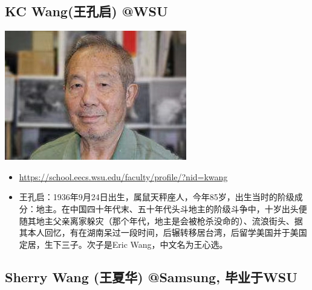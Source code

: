 \documentclass[9pt, b5paper]{article}
\begin{document}
\subsection{KC Wang(王孔启) @WSU}
\label{sec:org3a5d0f2}

\begin{center}
\includegraphics[width=.9\linewidth]{./pic/KCWang.jpg}
\end{center}
\begin{itemize}
\item \url{https://school.eecs.wsu.edu/faculty/profile/?nid=kwang}
\item 王孔启：1936年9月24日出生，属鼠天秤座人，今年85岁，出生当时的阶级成分：地主。在中国四十年代末、五十年代头斗地主的阶级斗争中，十岁出头便随其地主父亲离家躲灾（那个年代，地主是会被枪杀没命的）、流浪街头、据其本人回忆，有在湖南呆过一段时间，后辗转移居台湾，后留学美国并于美国定居，生下三子。次子是Eric Wang，中文名为王心选。
\end{itemize}
\subsection{Sherry Wang (王夏华) @Samsung, 毕业于WSU}
\label{sec:orgd32e7a2}
\end{document}
